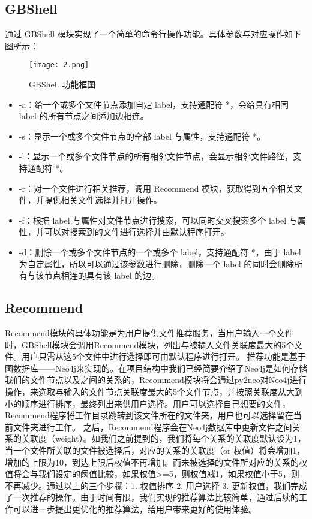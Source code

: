 \documentclass[UTF8]{ctexart}
\begin{document}
\subsection{GBShell}
通过 GBShell 模块实现了一个简单的命令行操作功能。具体参数与对应操作如下图所示：

\begin{figure}
\centering\texttt{[image: 2.png]}
\caption{GBShell 功能框图}
\end{figure}

\begin{itemize}
  \item -a：给一个或多个文件节点添加自定 label，支持通配符 *，会给具有相同 label 的所有节点之间添加边相连。
  \item -s：显示一个或多个文件节点的全部 label 与属性，支持通配符 *。
  \item -l：显示一个或多个文件节点的所有相邻文件节点，会显示相邻文件路径，支持通配符 *。
  \item -r：对一个文件进行相关推荐，调用 Recommend 模块，获取得到五个相关文件，并提供相关文件选择并打开操作。
  \item -f：根据 label 与属性对文件节点进行搜索，可以同时交叉搜索多个 label 与属性，并可以对搜索到的文件进行选择并由默认程序打开。
 \item -d：删除一个或多个文件节点的一个或多个 label，支持通配符 *，由于 label 为自定属性，所以可以通过该参数进行删除，删除一个 label 的同时会删除所有与该节点相连的具有该 label 的边。
\end{itemize}

\subsection{Recommend}
Recommend模块的具体功能是为用户提供文件推荐服务，当用户输入一个文件时，GBShell模块会调用Recommend模块，列出与被输入文件关联度最大的5个文件。用户只需从这5个文件中进行选择即可由默认程序进行打开。
推荐功能是基于图数据库——Neo4j来实现的。在项目结构中我们已经简要介绍了Neo4j是如何存储我们的文件节点以及之间的关系的，Recommend模块将会通过py2neo对Neo4j进行操作，来选取与输入的文件节点关联度最大的5个文件节点，并按照关联度从大到小的顺序进行排序，最终列出来供用户选择。用户可以选择自己想要的文件，Recommend程序将工作目录跳转到该文件所在的文件夹，用户也可以选择留在当前文件夹进行工作。
之后，Recommend程序会在Neo4j数据库中更新文件之间关系的关联度（weight）。如我们之前提到的，我们将每个关系的关联度默认设为1，当一个文件所关联的文件被选择后，对应的关系的关联度（or 权值）将会增加1，增加的上限为10，到达上限后权值不再增加。而未被选择的文件所对应的关系的权值将会与我们设定的阈值比较，如果权值>=5，则权值减1，如果权值小于5，则不再减少。通过以上的三个步骤：1. 权值排序 2. 用户选择 3. 更新权值，我们完成了一次推荐的操作。由于时间有限，我们实现的推荐算法比较简单，通过后续的工作可以进一步提出更优化的推荐算法，给用户带来更好的使用体验。
\end{document}
